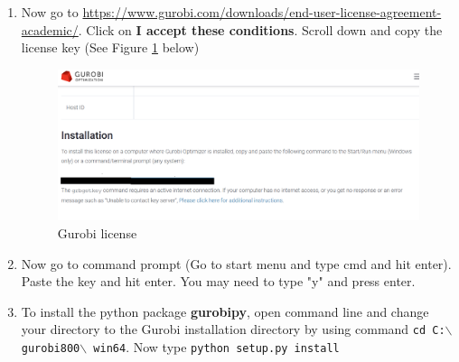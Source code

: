 \documentclass[11pt]{article}
\begin{document}
\begin{enumerate}
		\item Now go to \href{https://www.gurobi.com/downloads/end-user-license-agreement-academic/}{https://www.gurobi.com/downloads/end-user-license-agreement-academic/}. Click on \textbf{I accept these conditions}. Scroll down and copy the license key (See Figure \ref{fig:lic} below)
		
			\begin{figure}[h!]
			\centering
			\includegraphics[width=\linewidth]{Fig/license.png}
			\caption{Gurobi license}
			\label{fig:lic}
		\end{figure}
	
		\item Now go to command prompt (Go to start menu and type cmd and hit enter). Paste the key and hit enter. You may need to type "y" and press enter.
		\item To install the python package \textbf{gurobipy}, open command line and change your directory to the Gurobi installation directory by using command \texttt{cd C:$\backslash$gurobi800$\backslash$ win64}. Now type \texttt{python setup.py install}
	
		
	\end{enumerate}
	

	
	
	
	
\end{document}
